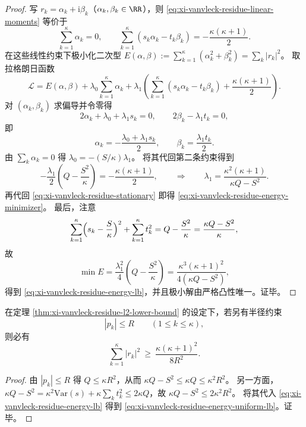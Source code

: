 \begin{proof}
写 \(r_k=\alpha_k+\mathrm{i}\beta_k\)（\(\alpha_k,\beta_k\in\RR\)），则 \eqref{eq:xi-vanvleck-residue-linear-moments} 等价于
\[
\sum_{k=1}^{\kappa}\alpha_k=0,\qquad
\sum_{k=1}^{\kappa}(s_k\alpha_k-t_k\beta_k)= -\frac{\kappa(\kappa+1)}{2}.
\]
在这些线性约束下极小化二次型
\(
E(\alpha,\beta):=\sum_{k=1}^{\kappa}(\alpha_k^2+\beta_k^2)
=\sum_k|r_k|^2
\)。
取拉格朗日函数
\[
\mathcal L
=E(\alpha,\beta)
+\lambda_0\sum_{k=1}^{\kappa}\alpha_k
+\lambda_1\left(\sum_{k=1}^{\kappa}(s_k\alpha_k-t_k\beta_k)+\frac{\kappa(\kappa+1)}{2}\right).
\]
对 \((\alpha_k,\beta_k)\) 求偏导并令零得
\[
2\alpha_k+\lambda_0+\lambda_1 s_k=0,\qquad
2\beta_k-\lambda_1 t_k=0,
\]
即
\begin{equation}\label{eq:xi-vanvleck-residue-stationary}
\alpha_k=-\frac{\lambda_0+\lambda_1 s_k}{2},\qquad \beta_k=\frac{\lambda_1 t_k}{2}.
\end{equation}
由 \(\sum_k\alpha_k=0\) 得 \(\lambda_0=-(S/\kappa)\lambda_1\)。
将其代回第二条约束得到
\[
-\frac{\lambda_1}{2}\left(Q-\frac{S^2}{\kappa}\right)=-\frac{\kappa(\kappa+1)}{2},
\qquad\Longrightarrow\qquad
\lambda_1=\frac{\kappa^2(\kappa+1)}{\kappa Q-S^2}.
\]
再代回 \eqref{eq:xi-vanvleck-residue-stationary} 即得 \eqref{eq:xi-vanvleck-residue-energy-minimizer}。
最后，注意
\[
\sum_{k=1}^{\kappa}\Bigl(s_k-\frac{S}{\kappa}\Bigr)^2+\sum_{k=1}^{\kappa}t_k^2
=Q-\frac{S^2}{\kappa}
=\frac{\kappa Q-S^2}{\kappa},
\]
故
\[
\min E
=\frac{\lambda_1^2}{4}\left(Q-\frac{S^2}{\kappa}\right)
=\frac{\kappa^3(\kappa+1)^2}{4(\kappa Q-S^2)},
\]
得到 \eqref{eq:xi-vanvleck-residue-energy-lb}，并且极小解由严格凸性唯一。证毕。
\end{proof}

\begin{corollary}[极点几何有界性导出的统一能量下界]\label{cor:xi-vanvleck-residue-energy-uniform-lb-under-radius}
在定理 \ref{thm:xi-vanvleck-residue-l2-lower-bound} 的设定下，若另有半径约束
\[
|p_k|\le R\qquad(1\le k\le \kappa),
\]
则必有
\begin{equation}\label{eq:xi-vanvleck-residue-energy-uniform-lb}
\sum_{k=1}^{\kappa}|r_k|^2\ \ge\ \frac{\kappa(\kappa+1)^2}{8R^2}.
\end{equation}
\end{corollary}
\begin{proof}
由 \(|p_k|\le R\) 得 \(Q\le \kappa R^2\)，从而 \(\kappa Q-S^2\le \kappa Q\le \kappa^2R^2\)。
另一方面，
\(
\kappa Q-S^2=\kappa^2\mathrm{Var}(s)+\kappa\sum_k t_k^2\le 2\kappa Q
\)，故 \(\kappa Q-S^2\le 2\kappa^2R^2\)。
将其代入 \eqref{eq:xi-vanvleck-residue-energy-lb} 得到 \eqref{eq:xi-vanvleck-residue-energy-uniform-lb}。证毕。
\end{proof}


